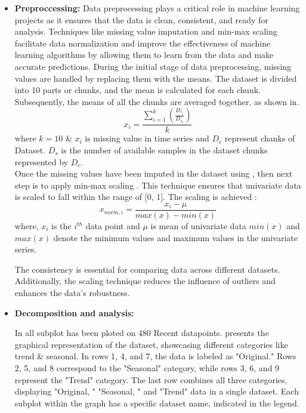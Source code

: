 \documentclass[a4paper, fleqn]{cas-sc}
\theoremstyle{definition}
\theoremstyle{remark}
\begin{document}
\begin{itemize}

\item
\textbf{Preproccessing:  }
Data preprocessing plays a critical role in machine learning projects as it ensures that the data is clean,  consistent,  and ready for analysis. Techniques like missing value imputation and min-max scaling facilitate data normalization and improve the effectiveness of machine learning algorithms by allowing them to learn from the data and make accurate predictions.
During the initial stage of data preprocessing,  missing values are handled by replacing them with the means. The dataset is divided into 10 parts or chunks,  and the mean is calculated for each chunk. Subsequently,  the means of all the chunks are averaged together,  as shown in.
\begin{equation} \label{equ: mean}
        x_i=\frac{\sum_{i=1}^{k} \left(\frac{D_{c_{i}}}{D_{s_{i}}} \right)}{k}
\end{equation}
 where $k=10$ \& $x_i$ is missing value in time series and $D_c$ represent chanks of Dataset. $D_s$ is the number of available samples in the dataset chunks represented by $D_c$. \\
Once the missing values have been imputed in the dataset using ,  then next step is to apply min-max scaling . This technique ensures that univariate data is scaled to fall within the range of [0, 1]. The scaling is achieved : 
\begin{equation}
        x_{norm,  i}=\frac{x_i - \mu}{max(x)-min(x)}
        \label{equ: minmax}
    \end{equation}
where,  $x_i$ is the $i^{th}$ data point and $\mu$ is mean of univariate data $min(x)$  and $max(x)$ denote the minimum values and maximum values in the univariate series.

The consistency is essential for comparing data across different datasets. Additionally,  the scaling technique reduces the influence of outliers and enhances the data's robustness.


\item
\textbf{Decomposition and analysis: }

In  all subplot has been ploted on 480 Recent datapoints.  presents the graphical representation of the dataset,  showcasing different categories like trend \&  seasonal. In rows 1,  4,  and 7,  the data is labeled as "Original." Rows 2,  5,  and 8 correspond to the "Seasonal" category,  while rows 3,  6,  and 9 represent the "Trend" category. The last row combines all three categories,  displaying "Original, " "Seasonal, " and "Trend" data in a single dataset. Each subplot within the graph has a specific dataset name,  indicated in the legend.


\end{itemize}
\end{document}
